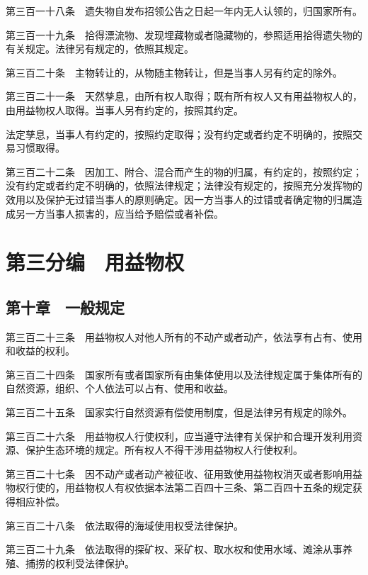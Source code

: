 \documentclass[UTF8,12pt,a4paper]{ctexbook}
\begin{document}
第三百一十八条　遗失物自发布招领公告之日起一年内无人认领的，归国家所有。

第三百一十九条　拾得漂流物、发现埋藏物或者隐藏物的，参照适用拾得遗失物的有关规定。法律另有规定的，依照其规定。

第三百二十条　主物转让的，从物随主物转让，但是当事人另有约定的除外。

第三百二十一条　天然孳息，由所有权人取得；既有所有权人又有用益物权人的，由用益物权人取得。当事人另有约定的，按照其约定。

法定孳息，当事人有约定的，按照约定取得；没有约定或者约定不明确的，按照交易习惯取得。

第三百二十二条　因加工、附合、混合而产生的物的归属，有约定的，按照约定；没有约定或者约定不明确的，依照法律规定；法律没有规定的，按照充分发挥物的效用以及保护无过错当事人的原则确定。因一方当事人的过错或者确定物的归属造成另一方当事人损害的，应当给予赔偿或者补偿。


\cleardoublepage
{}
\chapter*{第三分编　用益物权}

\section*{第十章　一般规定}

第三百二十三条　用益物权人对他人所有的不动产或者动产，依法享有占有、使用和收益的权利。

第三百二十四条　国家所有或者国家所有由集体使用以及法律规定属于集体所有的自然资源，组织、个人依法可以占有、使用和收益。

第三百二十五条　国家实行自然资源有偿使用制度，但是法律另有规定的除外。

第三百二十六条　用益物权人行使权利，应当遵守法律有关保护和合理开发利用资源、保护生态环境的规定。所有权人不得干涉用益物权人行使权利。

第三百二十七条　因不动产或者动产被征收、征用致使用益物权消灭或者影响用益物权行使的，用益物权人有权依据本法第二百四十三条、第二百四十五条的规定获得相应补偿。

第三百二十八条　依法取得的海域使用权受法律保护。

第三百二十九条　依法取得的探矿权、采矿权、取水权和使用水域、滩涂从事养殖、捕捞的权利受法律保护。

\end{document}
